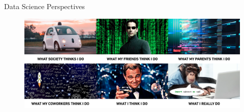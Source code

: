\documentclass[main.tex]{subfiles}
\begin{document}
    \begin{frame}{Data Science Perspectives}
        \begin{figure}
            \label{fig:data-science-meme}
            \includegraphics[width=\textwidth]{figures/external/data-science-meme.png}
        \end{figure}
    \end{frame}
    
\end{document}
